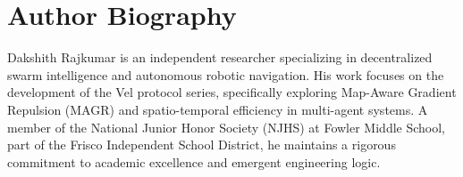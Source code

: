 \documentclass[journal,compsoc]{IEEEtran}
\begin{document}
\section*{Author Biography}
\vspace{-7ex} 

\begin{IEEEbiographynophoto}{Dakshith Rajkumar}
is an independent researcher specializing in decentralized swarm intelligence and autonomous robotic navigation. His work focuses on the development of the Vel protocol series, specifically exploring Map-Aware Gradient Repulsion (MAGR) and spatio-temporal efficiency in multi-agent systems. A member of the National Junior Honor Society (NJHS) at Fowler Middle School, part of the Frisco Independent School District, he maintains a rigorous commitment to academic excellence and emergent engineering logic.
\end{IEEEbiographynophoto}

\vfill %
\end{document}
